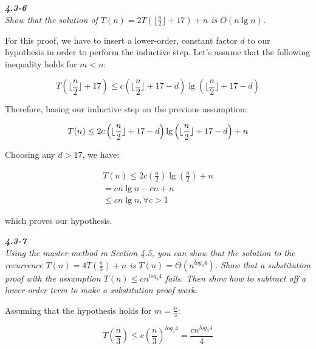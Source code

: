 \documentclass[8pt,a4paper]{article}
\begin{document}
\begin{framed}
\textbf{\textit{4.3-6}} \\
\textit{Show that the solution of $T(n) = 2T(\lfloor \frac{n}{2} \rfloor + 17) + n$ is $O(n \lg n)$.}
\end{framed}

  For this proof, we have to insert a lower-order, constant factor $d$ to our hypothesis
in order to perform the inductive step. Let's assume that the following inequality holds
for $m < n$:

\begin{equation*}
  T(\lfloor \frac{n}{2} \rfloor + 17) \leq c\left( \lfloor \frac{n}{2} \rfloor + 17 - d \right) \lg \left( \lfloor \frac{n}{2} \rfloor + 17 - d \right)
\end{equation*}

  Therefore, basing our inductive step on the previous assumption:

\begin{equation*}
  T(n) \leq 2c \left(\lfloor \frac{n}{2} \rfloor + 17 - d\right) \lg \left( \lfloor \frac{n}{2} \rfloor + 17 - d \right) + n \\
\end{equation*}

  Choosing any $d > 17$, we have:

\begin{equation*}
  \begin{split}
    T(n) \leq 2c \left( \frac{n}{2} \right) \lg \left( \frac{n}{2} \right) + n \\
    = cn\lg n - cn + n \\
    \leq cn\lg n, \forall c > 1
  \end{split}
\end{equation*}

which proves our hypothesis.

\begin{framed}
\textbf{\textit{4.3-7}} \\
\textit{Using the master method in Section 4.5, you can show that the solution to the recurrence
$T(n) = 4T(\frac{n}{3}) + n$ is $T(n) = \Theta(n^{log_{3} 4})$. Show that a substitution proof
with the assumption $T(n) \leq cn^{log_{3} 4}$ fails. Then show how to subtract off a lower-order
term to make a substitution proof work.}
\end{framed}

  Assuming that the hypothesis holds for $m = \frac{n}{3}$:

\begin{equation*}
  T\left(\frac{n}{3}\right) \leq c \left(\frac{n}{3}\right)^{log_{3} 4} = \frac{cn^{log_{3} 4}}{4}
\end{equation*}
\end{document}
